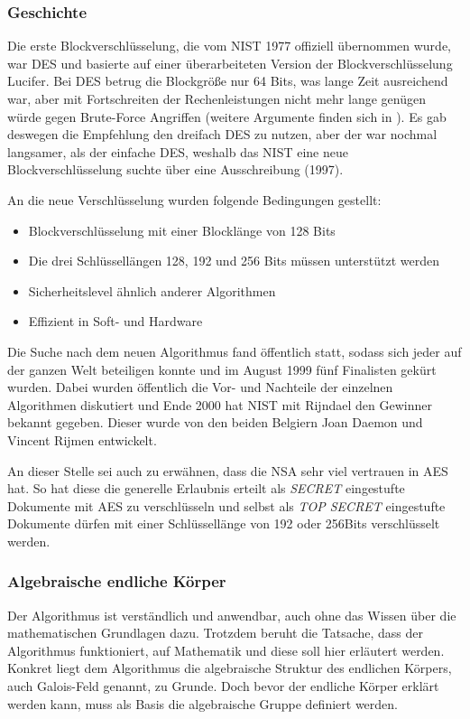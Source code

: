  \subsubsection{Geschichte}
 \label{aes-geschichte}
 Die erste Blockverschlüsselung, die vom \ac{NIST} 1977 offiziell übernommen wurde, war
 \ac{DES} und basierte auf einer überarbeiteten Version der Blockverschlüsselung Lucifer. Bei
 DES betrug die Blockgröße nur 64 Bits, was lange Zeit ausreichend war, aber mit Fortschreiten
 der Rechenleistungen nicht mehr lange genügen würde gegen Brute-Force Angriffen (weitere
 Argumente finden sich in \cite{paar10}). Es gab deswegen die Empfehlung den dreifach DES zu
 nutzen, aber der war nochmal langsamer, als der einfache DES, weshalb das NIST eine neue
 Blockverschlüsselung suchte über eine Ausschreibung (1997).
 
 An die neue Verschlüsselung wurden folgende Bedingungen gestellt:
\begin{itemize}
 \item Blockverschlüsselung mit einer Blocklänge von 128 Bits
 \item Die drei Schlüssellängen 128, 192 und 256 Bits müssen unterstützt werden
 \item Sicherheitslevel ähnlich anderer Algorithmen
 \item Effizient in Soft- und Hardware
\end{itemize} 

Die Suche nach dem neuen Algorithmus fand öffentlich statt, sodass sich jeder auf der ganzen
Welt beteiligen konnte und im August 1999 fünf Finalisten gekürt wurden. Dabei wurden
öffentlich die Vor- und Nachteile der einzelnen Algorithmen diskutiert und Ende 2000 hat NIST
mit Rijndael den Gewinner bekannt gegeben. Dieser wurde von den beiden Belgiern Joan
Daemon und Vincent Rijmen entwickelt.

An dieser Stelle sei auch zu erwähnen, dass die \ac{NSA} sehr viel vertrauen in AES hat. So hat
diese die generelle Erlaubnis erteilt als \emph{SECRET} eingestufte Dokumente mit AES zu
verschlüsseln und selbst als \emph{TOP SECRET} eingestufte Dokumente dürfen mit einer
Schlüssellänge von 192 oder 256Bits verschlüsselt werden. \cite{paar10}
 
 \subsubsection{Algebraische endliche Körper}
 Der Algorithmus ist verständlich und anwendbar, auch ohne das Wissen über die mathematischen
 Grundlagen dazu. Trotzdem beruht die Tatsache, dass der Algorithmus funktioniert, auf Mathematik
 und diese soll hier erläutert werden. Konkret liegt dem Algorithmus die algebraische Struktur des
 endlichen Körpers, auch Galois-Feld genannt, zu Grunde. Doch bevor der endliche Körper
 erklärt werden kann, muss als Basis die algebraische Gruppe definiert werden.
 

